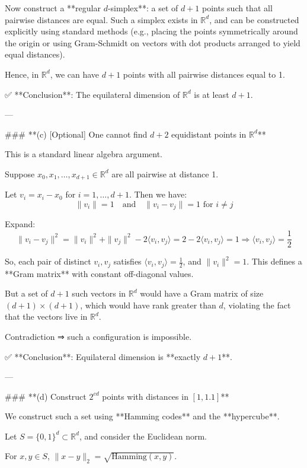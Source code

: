 \begin{enumerate}
\begin{shaded}
Now construct a **regular \( d \)-simplex**: a set of \( d+1 \) points such that all pairwise distances are equal. Such a simplex exists in \( \mathbb{R}^d \), and can be constructed explicitly using standard methods (e.g., placing the points symmetrically around the origin or using Gram-Schmidt on vectors with dot products arranged to yield equal distances).

Hence, in \( \mathbb{R}^d \), we can have \( d+1 \) points with all pairwise distances equal to 1.

✅ **Conclusion**: The equilateral dimension of \( \mathbb{R}^d \) is at least \( d+1 \).

---

### **(c) [Optional] One cannot find \( d+2 \) equidistant points in \( \mathbb{R}^d \)**

This is a standard linear algebra argument.

Suppose \( x_0, x_1, \dots, x_{d+1} \in \mathbb{R}^d \) are all pairwise at distance 1.

Let \( v_i = x_i - x_0 \) for \( i = 1, \dots, d+1 \). Then we have:
\[
\|v_i\| = 1 \quad \text{and} \quad \|v_i - v_j\| = 1 \text{ for } i \neq j
\]

Expand:
\[
\|v_i - v_j\|^2 = \|v_i\|^2 + \|v_j\|^2 - 2\langle v_i, v_j \rangle = 2 - 2\langle v_i, v_j \rangle = 1
\Rightarrow \langle v_i, v_j \rangle = \frac{1}{2}
\]

So, each pair of distinct \( v_i, v_j \) satisfies \( \langle v_i, v_j \rangle = \frac{1}{2} \), and \( \|v_i\|^2 = 1 \). This defines a **Gram matrix** with constant off-diagonal values.

But a set of \( d+1 \) such vectors in \( \mathbb{R}^d \) would have a Gram matrix of size \( (d+1) \times (d+1) \), which would have rank greater than \( d \), violating the fact that the vectors live in \( \mathbb{R}^d \).

Contradiction ⇒ such a configuration is impossible.

✅ **Conclusion**: Equilateral dimension is **exactly \( d+1 \)**.

---

### **(d) Construct \( 2^{cd} \) points with distances in \( [1, 1.1] \)**

We construct such a set using **Hamming codes** and the **hypercube**.

Let \( S = \{0,1\}^d \subset \mathbb{R}^d \), and consider the Euclidean norm.

For \( x, y \in S \), \( \|x - y\|_2 = \sqrt{\text{Hamming}(x,y)} \).


\end{shaded}
\end{enumerate}
